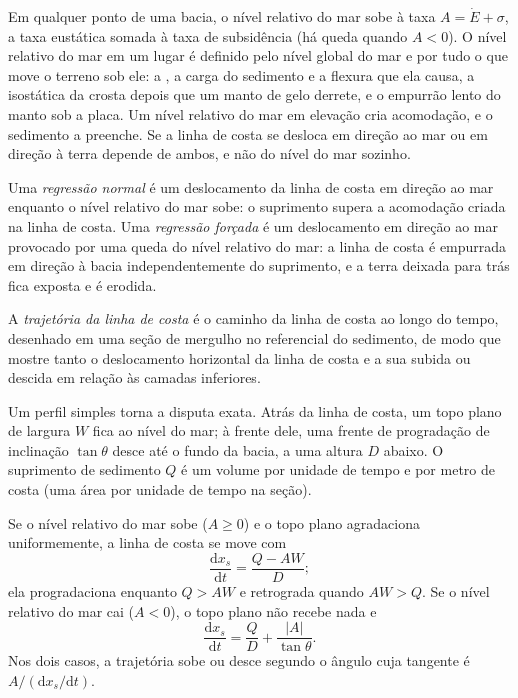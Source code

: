 Em qualquer ponto de uma bacia, o nível relativo do mar sobe à taxa $A = \dot E
+ \sigma$, a taxa eustática somada à taxa de subsidência (há queda quando $A < 0$).
O nível relativo do mar em um lugar é definido pelo nível global do mar e por
tudo o que move o terreno sob ele: a , a carga do
sedimento e a flexura que ela causa, a  isostática da crosta depois que um manto de gelo
derrete, e o empurrão lento do manto sob a placa. Um nível relativo do mar em elevação
cria acomodação, e o sedimento a preenche. Se a
linha de costa se desloca em direção ao mar ou em direção à terra depende de ambos, e não do nível do mar
sozinho.

\begin{definition}\label{def:b3:sequence-stratigraphy:regression}
Uma \emph{regressão normal} é um deslocamento da linha de costa em direção ao mar
enquanto o nível relativo do mar sobe: o suprimento supera a
acomodação criada na linha de costa. Uma \emph{regressão forçada}
é um deslocamento em direção ao mar provocado por uma queda do nível relativo do mar: a
linha de costa é empurrada em direção à bacia independentemente do suprimento, e a terra deixada para trás
fica exposta e é erodida.
\end{definition}

\begin{definition}\label{def:b3:sequence-stratigraphy:trajectory}
A \emph{trajetória da linha de costa} é o caminho da
linha de costa ao longo do tempo, desenhado em uma seção de mergulho no referencial do
sedimento, de modo que mostre tanto o deslocamento horizontal da linha de costa e a sua
subida ou descida em relação às camadas inferiores.
\end{definition}

Um perfil simples torna a disputa exata. Atrás da linha de costa, um topo plano
de largura $W$ fica ao nível do mar; à frente dele, uma frente de progradação de inclinação
$\tan\theta$ desce até o fundo da bacia, a uma altura $D$ abaixo. O suprimento de sedimento
$Q$ é um volume por unidade de tempo e por metro de costa (uma área por unidade de tempo
na seção).

\begin{proposition}\label{prop:b3:sequence-stratigraphy:trajectory}
Se o nível relativo do mar sobe ($A \ge 0$) e o topo plano agradaciona uniformemente,
a linha de costa se move com
\[
\frac{\mathrm dx_s}{\mathrm dt} = \frac{Q - AW}{D};
\]
ela progradaciona enquanto $Q > AW$ e retrograda quando $AW > Q$. Se o nível relativo do mar
cai ($A < 0$), o topo plano não recebe nada e
\[
\frac{\mathrm dx_s}{\mathrm dt} = \frac{Q}{D} + \frac{|A|}{\tan\theta}.
\]
Nos dois casos, a trajetória sobe ou desce segundo o ângulo cuja tangente é
$A/(\mathrm dx_s/\mathrm dt)$.
\end{proposition}

